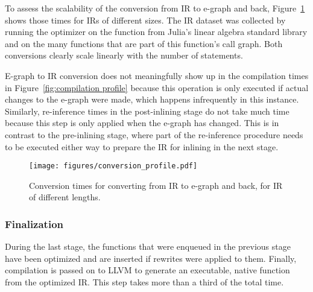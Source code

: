To assess the scalability of the conversion from IR to e-graph and back, Figure~\ref{fig:conversion profile} shows those times for IRs of different sizes. The IR dataset was collected by running the optimizer on the  function from Julia's linear algebra standard library and on the many functions that are part of this function's call graph. Both conversions clearly scale linearly with the number of statements.

E-graph to IR conversion does not meaningfully show up in the compilation times in Figure~\ref{fig:compilation profile} because this operation is only executed if actual changes to the e-graph were made, which happens infrequently in this instance.
Similarly, re-inference times in the post-inlining stage do not take much time because this step is only applied when the e-graph has changed.
This is in contrast to the pre-inlining stage, where part of the re-inference procedure needs to be executed either way to prepare the IR for inlining in the next stage.
\begin{figure}
    \centering
    \texttt{[image: figures/conversion\_profile.pdf]}
    \caption{Conversion times for converting from IR to e-graph and back, for IR of different lengths.}
    \label{fig:conversion profile}
\end{figure}

\subsubsection{Finalization} During the last stage, the functions that were enqueued in the previous stage have been optimized and are inserted if rewrites were applied to them.
Finally, compilation is passed on to LLVM to generate an executable, native function from the optimized IR.
This step takes more than a third of the total time.

